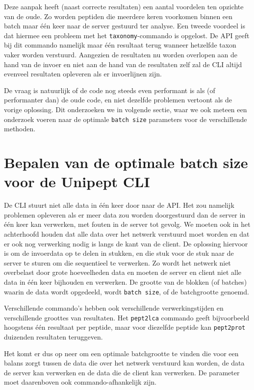 Deze aanpak heeft (naast correcte resultaten) een aantal voordelen ten opzichte
van de oude. Zo worden peptiden die meerdere keren voorkomen binnen een batch
maar één keer naar de server gestuurd ter analyse. Een tweede voordeel is dat
hiermee een probleem met het \texttt{taxonomy}-commando is opgelost. De API
geeft bij dit commando namelijk maar één resultaat terug wanneer hetzelfde 
taxon vaker worden verstuurd. Aangezien de resultaten nu worden overlopen aan de
hand van de invoer en niet aan de hand van de resultaten zelf zal de CLI altijd 
evenveel resultaten opleveren als er invoerlijnen zijn.

De vraag is natuurlijk of de code nog steeds even performant is als (of
performanter dan) de oude code, en niet dezelfde problemen vertoont als de
vorige oplossing. Dit onderzoeken we in volgende sectie, waar we ook meteen een
onderzoek voeren naar de optimale \texttt{batch size} parameters voor de
verschillende methoden.

\section[Bepalen van de optimale batch size voor de Unipept CLI]{Bepalen van de 
optimale batch size voor de Unipept CLI }

De CLI stuurt niet alle data in één keer door naar de API. Het zou namelijk
problemen opleveren als er meer data zou worden doorgestuurd dan de server in
één keer kan verwerken, met fouten in de server tot gevolg. We moeten ook in het
achterhoofd houden dat alle data over het netwerk verstuurd moet worden en dat
er ook nog verwerking nodig is langs de kant van de client. De oplossing
hiervoor is om de invoerdata op te delen in stukken, en die stuk voor de stuk
naar de server te sturen om die sequentieel te verwerken. Zo wordt het netwerk
niet overbelast door grote hoeveelheden data en moeten de server en client niet
alle data in één keer bijhouden en verwerken. De grootte van de blokken (of
batches) waarin de data wordt opgedeeld, wordt \texttt{batch size}, of de
batchgrootte genoemd.

Verschillende commando's hebben ook verschillende verwerkingstijden en 
verschillende groottes van resultaten. Het \texttt{pept2lca} commando geeft 
bijvoorbeeld hoogstens één resultaat per peptide, maar voor diezelfde peptide 
kan \texttt{pept2prot} duizenden resultaten teruggeven.

Het komt er dus op neer om een optimale batchgrootte te vinden die voor een 
balans zorgt tussen de data die over het netwerk verstuurd kan worden, de data 
de server kan verwerken en de data die de client kan verwerken. De parameter 
moet daarenboven ook commando-afhankelijk zijn.

